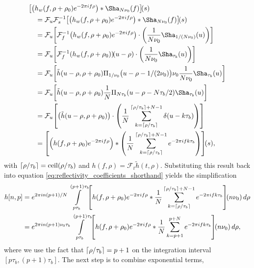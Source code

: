 \begingroup
\allowdisplaybreaks
\begin{align}
 &\brak*{\paren*{h_w(f, \rho + \rho_0) e^{-2\pi i f\rho}} * \Sha_{N\nu_0}(f)}\!(s)\nonumber\\
 &\quad= \mathcal{F}_{u}\mathcal{F}_{s}^{-1} \brak*{\paren*{h_w(f, \rho + \rho_0) e^{-2\pi i f\rho}} * \Sha_{N\nu_0}(f)}\!(s)\nonumber\\
 &\quad= \mathcal{F}_{u}\brak*{\mathcal{F}_{f}^{-1} \paren*{h_w(f, \rho + \rho_0) e^{-2\pi i f\rho}} \cdot \paren*{\frac{1}{N\nu_0}\Sha_{1/(N\nu_0)}(u)}}\nonumber\\
 &\quad= \mathcal{F}_{u}\brak*{\mathcal{F}_{f}^{-1}\paren*{h_w(f, \rho + \rho_0)}\!(u - \rho) \cdot \paren*{\frac{1}{N\nu_0} \Sha_{\tau_b}(u)}}\nonumber\\
 &\quad= \mathcal{F}_{u}\brak*{\tilde{h}(u - \rho, \rho + \rho_0) \Pi_{1/\nu_0}\bigl(u - \rho - 1/(2\nu_0)\bigr) \nu_0 \frac{1}{N\nu_0}\Sha_{\tau_b}(u)}\nonumber\\
 &\quad= \mathcal{F}_{u}\brak*{\tilde{h}(u - \rho, \rho + \rho_0) \frac{1}{N} \Pi_{N\tau_b}\paren*{u - \rho - N\tau_b/2} \Sha_{\tau_b}(u)}\nonumber\\
 &\quad= \mathcal{F}_{u}\brak*{\paren*{\tilde{h}(u - \rho, \rho + \rho_0)} \cdot \paren*{\frac{1}{N} \sum_{k=\ceil{\rho/\tau_b}}^{\ceil{\rho/\tau_b} + N - 1} \delta\paren*{u - k\tau_b}} }\nonumber\\
 &\quad= \brak*{ \Bigl( h(f, \rho + \rho_0) e^{-2\pi i f\rho} \Bigr) * \paren*{ \frac{1}{N} \sum_{k=\ceil{\rho/\tau_b}}^{\ceil{\rho/\tau_b} + N - 1} e^{-2\pi i fk\tau_b} } }\!(s),
\end{align}
\endgroup
with $\lceil\rho/\tau_b\rceil = \mathrm{ceil}(\rho/\tau_b)$ and $h(f, \rho) = \mathcal{F}_{t} \tilde{h}(t, \rho)$. Substituting this result back into equation \eqref{eq:reflectivity_coefficients_shorthand} yields the simplification
\begin{align*}
 h[n,p] &= e^{2 \pi i n(p+1)/N} \int\limits_{p\tau_b}^{(p+1)\tau_b} \brak*{ h(f, \rho + \rho_0) e^{-2\pi i f\rho} * \frac{1}{N} \sum_{k=\ceil{\rho/\tau_b}}^{\ceil{\rho/\tau_b} + N - 1} e^{-2\pi i fk\tau_b} }\!(n\nu_0) \dee\rho\nonumber\\
 &= e^{2 \pi i n(p+1)\nu_0\tau_b} \int\limits_{p\tau_b}^{(p+1)\tau_b} \brak*{ h(f, \rho + \rho_0) e^{-2\pi i f\rho} * \frac{1}{N} \sum_{k=p+1}^{p + N} e^{-2\pi i fk\tau_b} }\!(n\nu_0) \dee\rho,
\end{align*}
where we use the fact that $\lceil\rho/\tau_b\rceil = p+1$ on the integration interval $[p\tau_b, (p+1)\tau_b]$. The next step is to combine exponential terms,
